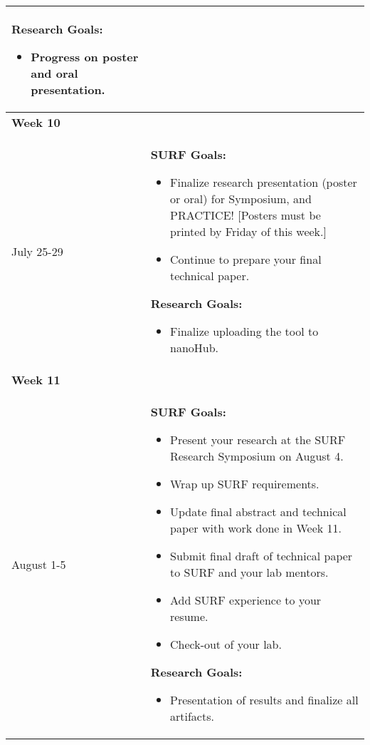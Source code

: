 \documentclass[a4paper]{journal}
\begin{document}
\begin{longtable}{| m{} | p{}|}
                                    \textbf{Research Goals:}
                                    \begin{itemize}
                                      \item Progress on poster and oral presentation.
                                    \end{itemize}\\
  \hline
  \textbf{Week 10} & \\ July 25-29 &  \textbf{SURF Goals:}
                                    \begin{itemize}
                                      \item Finalize research presentation (poster or oral) for Symposium, and PRACTICE! [Posters must be printed by Friday of this week.]
                                      \item Continue to prepare your final technical paper.
                                    \end{itemize}
                                    \textbf{Research Goals:}
                                    \begin{itemize}
                                      \item Finalize uploading the tool to nanoHub.
                                    \end{itemize}\\
  \hline
  \textbf{Week 11} & \\ August 1-5 &  \textbf{SURF Goals:}
                                    \begin{itemize}
                                      \item Present your research at the SURF Research Symposium on August 4.
                                      \item Wrap up SURF requirements.
                                      \item Update final abstract and technical paper with work done in Week 11.
                                      \item Submit final draft of technical paper to SURF and your lab mentors.
                                      \item Add SURF experience to your resume.
                                      \item Check-out of your lab.
                                    \end{itemize}
                                    \textbf{Research Goals:}
                                    \begin{itemize}
                                      \item Presentation of results and finalize all artifacts.
                                    \end{itemize}\\
  \hline
\end{longtable}
\end{document}
